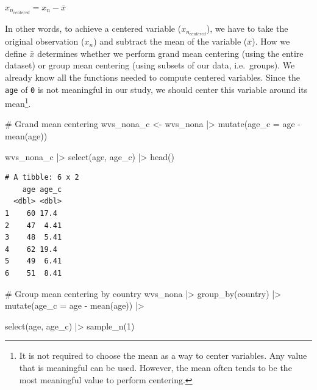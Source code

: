 \documentclass[
  letterpaper,
]{krantz}
\makeatletter
\newenvironment{Shaded}{\begin{snugshade}}{\end{snugshade}}
\newcommand{\AttributeTok}[1]{\textcolor[rgb]{0.40,0.45,0.13}{#1}}
\newcommand{\CommentTok}[1]{\textcolor[rgb]{0.37,0.37,0.37}{#1}}
\newcommand{\DecValTok}[1]{\textcolor[rgb]{0.68,0.00,0.00}{#1}}
\newcommand{\FunctionTok}[1]{\textcolor[rgb]{0.28,0.35,0.67}{#1}}
\newcommand{\NormalTok}[1]{\textcolor[rgb]{0.00,0.23,0.31}{#1}}
\newcommand{\OtherTok}[1]{\textcolor[rgb]{0.00,0.23,0.31}{#1}}
\newcommand{\SpecialCharTok}[1]{\textcolor[rgb]{0.37,0.37,0.37}{#1}}
\newenvironment{kframe}{%
\medskip{}
\setlength{\fboxsep}{.8em}
 \def\at@end@of@kframe{}%
 \ifinner\ifhmode%
  \def\at@end@of@kframe{\end{minipage}}%
  \begin{minipage}{\columnwidth}%
 \fi\fi%
 \def\FrameCommand##1{\hskip\@totalleftmargin \hskip-\fboxsep
 \colorbox{shadecolor}{##1}\hskip-\fboxsep
     \hskip-\linewidth \hskip-\@totalleftmargin \hskip\columnwidth}%
 \MakeFramed {\advance\hsize-\width
   \@totalleftmargin\z@ \linewidth\hsize
   \@setminipage}}%
 {\par\unskip\endMakeFramed%
 \at@end@of@kframe}
\renewenvironment{Shaded}{\begin{kframe}}{\end{kframe}}
\makeatother
\begin{document}
\label{centering-formula}
\(x_{n_{centered}} = x_n - \overline{x}\)

In other words, to achieve a centered variable (\(x_{n_{centered}}\)),
we have to take the original observation (\(x_n\)) and subtract the mean
of the variable (\(\bar{x}\)). How we define \(\bar{x}\) determines
whether we perform grand mean centering (using the entire dataset) or
group mean centering (using subsets of our data, i.e.~groups). We
already know all the functions needed to compute centered variables.
Since the \texttt{age} of \texttt{0} is not meaningful in our study, we
should center this variable around its mean\footnote{It is not required
  to choose the mean as a way to center variables. Any value that is
  meaningful can be used. However, the mean often tends to be the most
  meaningful value to perform centering.}.

\begin{Shaded}
\begin{Highlighting}[]
\CommentTok{\# Grand mean centering}
\NormalTok{wvs\_nona\_c }\OtherTok{\textless{}{-}}
\NormalTok{  wvs\_nona }\SpecialCharTok{|\textgreater{}}
  \FunctionTok{mutate}\NormalTok{(}\AttributeTok{age\_c =}\NormalTok{ age }\SpecialCharTok{{-}} \FunctionTok{mean}\NormalTok{(age))}

\NormalTok{wvs\_nona\_c }\SpecialCharTok{|\textgreater{}}
  \FunctionTok{select}\NormalTok{(age, age\_c) }\SpecialCharTok{|\textgreater{}}
  \FunctionTok{head}\NormalTok{()}
\end{Highlighting}
\end{Shaded}

\begin{verbatim}
# A tibble: 6 x 2
    age age_c
  <dbl> <dbl>
1    60 17.4 
2    47  4.41
3    48  5.41
4    62 19.4 
5    49  6.41
6    51  8.41
\end{verbatim}

\begin{Shaded}
\begin{Highlighting}[]
\CommentTok{\# Group mean centering by country}
\NormalTok{wvs\_nona }\SpecialCharTok{|\textgreater{}}
  \FunctionTok{group\_by}\NormalTok{(country) }\SpecialCharTok{|\textgreater{}}
  \FunctionTok{mutate}\NormalTok{(}\AttributeTok{age\_c =}\NormalTok{ age }\SpecialCharTok{{-}} \FunctionTok{mean}\NormalTok{(age)) }\SpecialCharTok{|\textgreater{}}
  
  \FunctionTok{select}\NormalTok{(age, age\_c) }\SpecialCharTok{|\textgreater{}}
  \FunctionTok{sample\_n}\NormalTok{(}\DecValTok{1}\NormalTok{)}
\end{Highlighting}
\end{Shaded}
\end{document}
